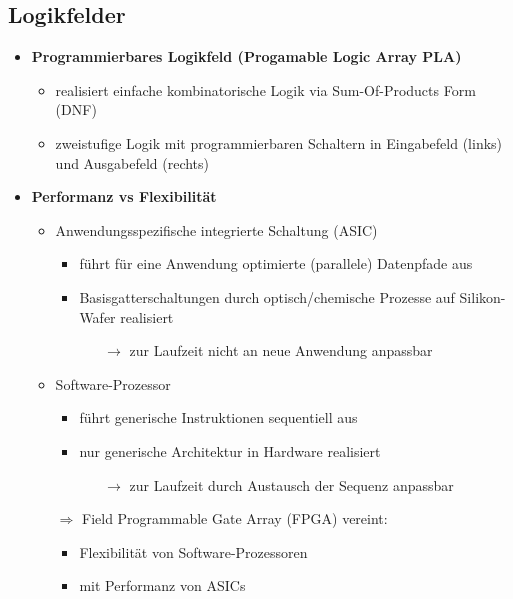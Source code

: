 \subsection{Logikfelder}
\begin{itemize}

\item \textbf{Programmierbares Logikfeld (Progamable Logic Array PLA)}
	\begin{itemize}
	\item realisiert einfache kombinatorische Logik via Sum-Of-Products Form (DNF)
	\item zweistufige Logik mit programmierbaren Schaltern in Eingabefeld (links) und Ausgabefeld (rechts)
	\end{itemize}
	
\item \textbf{Performanz vs Flexibilität}
	\begin{itemize}
	\item Anwendungsspezifische integrierte Schaltung (ASIC)
		\begin{itemize}
		\item führt für eine Anwendung optimierte (parallele) Datenpfade aus
		\item Basisgatterschaltungen durch optisch/chemische Prozesse auf Silikon-Wafer realisiert
			\begin{itemize}
			\item[$\rightarrow$] zur Laufzeit nicht an neue Anwendung anpassbar
			\end{itemize}
		\end{itemize}
	\item Software-Prozessor
		\begin{itemize}
		\item führt generische Instruktionen sequentiell aus
		\item nur generische Architektur in Hardware realisiert
			\begin{itemize}
			\item[$\rightarrow$] zur Laufzeit durch Austausch der Sequenz anpassbar
			\end{itemize}
		\end{itemize}
	\item[$\Rightarrow$] Field Programmable Gate Array (FPGA) vereint:
		\begin{itemize}
		\item Flexibilität von Software-Prozessoren
		\item mit Performanz von ASICs
		\end{itemize}
	\end{itemize}
	

\end{itemize}

